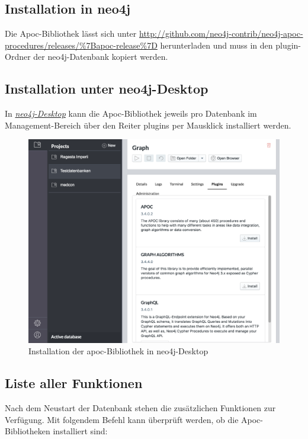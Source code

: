 \documentclass[ngerman,]{scrreprt}
\begin{document}
\subsection{Installation in neo4j}\label{installation-in-neo4j}

Die Apoc-Bibliothek lässt sich unter \url{http://github.com/neo4j-contrib/neo4j-apoc-procedures/releases/\%7Bapoc-release\%7D} herunterladen und muss in den plugin-Ordner der neo4j-Datenbank kopiert werden.

\subsection{Installation unter neo4j-Desktop}\label{installation-unter-neo4j-desktop}

In \href{https://neo4j.com/download/}{\emph{neo4j-Desktop}} kann die Apoc-Bibliothek jeweils pro Datenbank im Management-Bereich über den Reiter plugins per Mausklick installiert werden.

\begin{figure}
\centering
\includegraphics{Bilder/cypherFortgeschrittene/neo4j-Desktop-install-apoc.png}
\caption{Installation der apoc-Bibliothek in neo4j-Desktop}
\end{figure}

\subsection{Liste aller Funktionen}\label{liste-aller-funktionen}

Nach dem Neustart der Datenbank stehen die zusätzlichen Funktionen zur Verfügung. Mit folgendem Befehl kann überprüft werden, ob die Apoc-Bibliotheken installiert sind:
\end{document}
